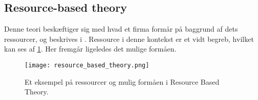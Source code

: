 \subsection{Resource-based theory}\label{resource-based}

Denne teori beskæftiger sig med hvad et firma formår på baggrund af dets ressourcer, og beskrives i \citet[p.~13]{rose2012software}.
Ressource i denne kontekst er et vidt begreb, hvilket kan ses af \cref{rbt_fig}.
Her fremgår ligeledes det mulige formåen.

\begin{figure}[H]
  \begin{center}
    \texttt{[image: resource\_based\_theory.png]}
  \end{center}
  \caption{Et eksempel på ressourcer og mulig formåen i Resource Based Theory.}
  \label{rbt_fig}
\end{figure}

